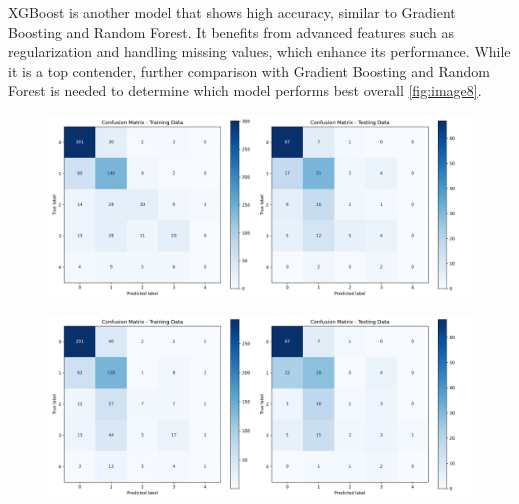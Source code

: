 \documentclass[pdflatex,sn-nature,Numbered]{sn-jnl}%
\theoremstyle{thmstyleone}%
\theoremstyle{thmstyletwo}%
\theoremstyle{thmstylethree}%
\begin{document}
XGBoost is another model that shows high accuracy, similar to Gradient Boosting and Random Forest. It benefits from advanced features such as regularization and handling missing values, which enhance its performance. While it is a top contender, further comparison with Gradient Boosting and Random Forest is needed to determine which model performs best overall \autoref{fig:image8}.


\begin{figure}[htbp]
\centering
\begin{minipage}{0.45\textwidth}
    \centering
    \includegraphics[width=\linewidth]{files/knn1.png}
    \label{fig:image1}
\end{minipage}%
\hfill
\begin{minipage}{0.45\textwidth}
    \centering
    \includegraphics[width=\linewidth]{files/svm1.png}
    \label{fig:image2}
\end{minipage}

\vspace{1em}


\end{figure}
\end{document}
